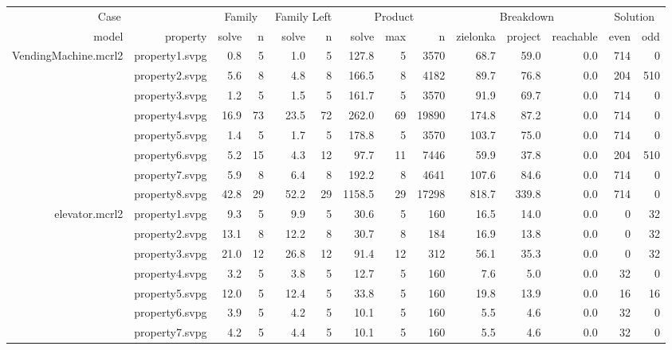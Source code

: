 \documentclass{standalone}
\begin{document}
\begin{tabular}{r r|r r|r r|r r r|r r r|r r}
\multicolumn{2}{|c|}{Case} & \multicolumn{2}{c|}{Family} & \multicolumn{2}{c|}{Family Left} & \multicolumn{3}{c|}{Product} & \multicolumn{3}{c|}{Breakdown} & \multicolumn{2}{c}{Solution} \\
model & property & solve & n & solve & n & solve & max & n & zielonka & project & reachable & even & odd \\ \hline
VendingMachine.mcrl2 & property1.svpg                 & 0.8 & 5 & 1.0 & 5 & 127.8 & 5 & 3570 & 68.7 & 59.0 & 0.0 & 714 & 0 \\
 & property2.svpg                 & 5.6 & 8 & 4.8 & 8 & 166.5 & 8 & 4182 & 89.7 & 76.8 & 0.0 & 204 & 510 \\
 & property3.svpg                 & 1.2 & 5 & 1.5 & 5 & 161.7 & 5 & 3570 & 91.9 & 69.7 & 0.0 & 714 & 0 \\
 & property4.svpg                 & 16.9 & 73 & 23.5 & 72 & 262.0 & 69 & 19890 & 174.8 & 87.2 & 0.0 & 714 & 0 \\
 & property5.svpg                 & 1.4 & 5 & 1.7 & 5 & 178.8 & 5 & 3570 & 103.7 & 75.0 & 0.0 & 714 & 0 \\
 & property6.svpg                 & 5.2 & 15 & 4.3 & 12 & 97.7 & 11 & 7446 & 59.9 & 37.8 & 0.0 & 204 & 510 \\
 & property7.svpg                 & 5.9 & 8 & 6.4 & 8 & 192.2 & 8 & 4641 & 107.6 & 84.6 & 0.0 & 714 & 0 \\
 & property8.svpg                 & 42.8 & 29 & 52.2 & 29 & 1158.5 & 29 & 17298 & 818.7 & 339.8 & 0.0 & 714 & 0 \\
elevator.mcrl2 & property1.svpg                 & 9.3 & 5 & 9.9 & 5 & 30.6 & 5 & 160 & 16.5 & 14.0 & 0.0 & 0 & 32 \\
 & property2.svpg                 & 13.1 & 8 & 12.2 & 8 & 30.7 & 8 & 184 & 16.9 & 13.8 & 0.0 & 0 & 32 \\
 & property3.svpg                 & 21.0 & 12 & 26.8 & 12 & 91.4 & 12 & 312 & 56.1 & 35.3 & 0.0 & 0 & 32 \\
 & property4.svpg                 & 3.2 & 5 & 3.8 & 5 & 12.7 & 5 & 160 & 7.6 & 5.0 & 0.0 & 32 & 0 \\
 & property5.svpg                 & 12.0 & 5 & 12.4 & 5 & 33.8 & 5 & 160 & 19.8 & 13.9 & 0.0 & 16 & 16 \\
 & property6.svpg                 & 3.9 & 5 & 4.2 & 5 & 10.1 & 5 & 160 & 5.5 & 4.6 & 0.0 & 32 & 0 \\
 & property7.svpg                 & 4.2 & 5 & 4.4 & 5 & 10.1 & 5 & 160 & 5.5 & 4.6 & 0.0 & 32 & 0 \\

\end{tabular}
\end{document}
